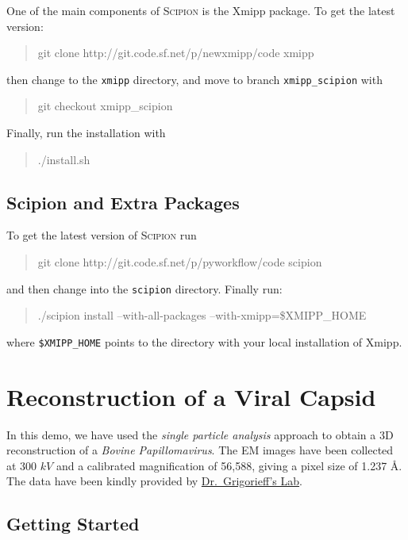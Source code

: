 \documentclass[12pt]{article} %
\newcommand{\scipion}{\textsc{Scipion} }
\newenvironment{command}{\tt\begin{quote}}{\end{quote}}
\begin{document}
One of the main components of \scipion is the Xmipp package. To get
the latest version:

\begin{command}
git clone http://git.code.sf.net/p/newxmipp/code xmipp
\end{command}

\noindent
then change to the \verb+xmipp+ directory, and move to branch \verb+xmipp_scipion+ with

\begin{command}
git checkout xmipp\_scipion
\end{command}

Finally, run the installation with

\begin{command}
./install.sh
\end{command}

\subsection{Scipion and Extra Packages}

To get the latest version of \scipion run

\begin{command}
git clone http://git.code.sf.net/p/pyworkflow/code scipion
\end{command}

\noindent
and then change into the \verb+scipion+ directory. Finally run:

\begin{command}
./scipion install --with-all-packages --with-xmipp=\$XMIPP\_HOME
\end{command}

\noindent
where \verb+$XMIPP_HOME+ points to the directory with your local
installation of Xmipp.


\section{Reconstruction of a Viral Capsid}

In this demo, we have used the \emph{single particle analysis} approach to obtain
a 3D reconstruction of a \emph{Bovine Papillomavirus}. The EM images have been
collected at 300 $kV$ and a calibrated magnification of 56,588,  %
giving a pixel
size of 1.237 \AA  \citep{Wolf2010}. The data have been kindly
provided by \href{http://grigoriefflab.janelia.org/}{Dr.~Grigorieff’s Lab}.

\subsection{Getting Started}
\end{document}
